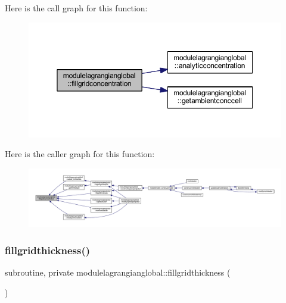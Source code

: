 Here is the call graph for this function\+:\nopagebreak
\begin{figure}[H]
\begin{center}
\leavevmode
\includegraphics[width=350pt]{namespacemodulelagrangianglobal_ac90a060ac9ab05f2c54c45b4b76ca984_cgraph}
\end{center}
\end{figure}
Here is the caller graph for this function\+:\nopagebreak
\begin{figure}[H]
\begin{center}
\leavevmode
\includegraphics[width=350pt]{namespacemodulelagrangianglobal_ac90a060ac9ab05f2c54c45b4b76ca984_icgraph}
\end{center}
\end{figure}
\mbox{\label{namespacemodulelagrangianglobal_a36b19f9334aaf4289e0ec7ea7eea643c}} 
\subsubsection{\texorpdfstring{fillgridthickness()}{fillgridthickness()}}
{\footnotesize\ttfamily subroutine, private modulelagrangianglobal\+::fillgridthickness (\begin{DoxyParamCaption}{ }\end{DoxyParamCaption})\hspace{0.3cm}{\ttfamily [private]}}

